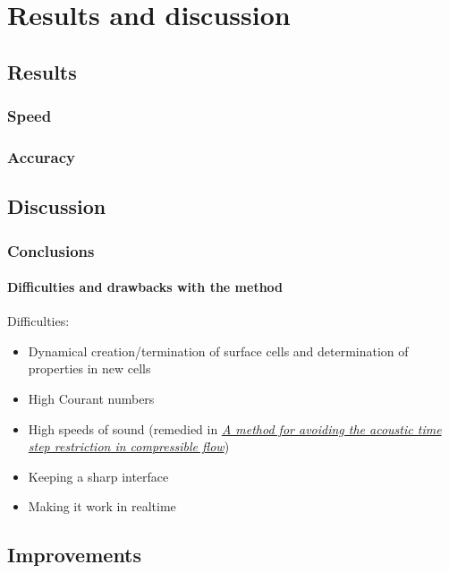 \documentclass[]{report}
\begin{document}
\part{Results and discussion}

\chapter{Results}

\section{Speed}

\section{Accuracy}

\chapter{Discussion}

\section{Conclusions}

\subsection{Difficulties and drawbacks with the method}

Difficulties:
\begin{itemize}
    \item Dynamical creation/termination of surface cells and determination of properties in new cells
    \item High Courant numbers
    \item High speeds of sound (remedied in \textit{\href{http://physbam.stanford.edu/~kwatra/papers/compressible_semi_implicit/compressible_semi_implicit.pdf}{A method for avoiding the acoustic time step restriction in compressible flow}})
    \item Keeping a sharp interface
    \item Making it work in realtime
\end{itemize}

\chapter{Improvements}
\end{document}
